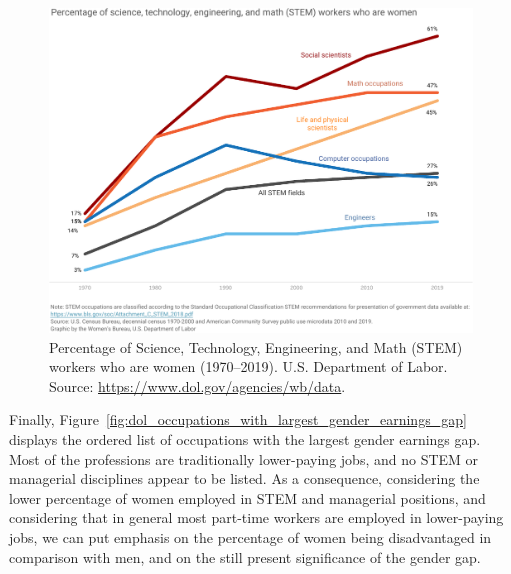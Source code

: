 \begin{figure}[t!]
\includegraphics[scale=.7]{figures/dol_stem_percent_women.pdf}
\centering
\caption{Percentage of Science, Technology, Engineering, and Math (STEM) workers who are women (1970--2019).\newline
U.S. Department of Labor. Source: \upshape\protect\url{https://www.dol.gov/agencies/wb/data}.}
\label{fig:dol_stem_percent_women}
\end{figure}

Finally, Figure~\ref{fig:dol_occupations_with_largest_gender_earnings_gap} displays the ordered list of occupations with the largest gender earnings gap. Most of the professions are traditionally lower-paying jobs, and no STEM or managerial disciplines appear to be listed. As a consequence, considering the lower percentage of women employed in STEM and managerial positions, and considering that in general most part-time workers are employed in lower-paying jobs, we can put emphasis on the percentage of women being disadvantaged in comparison with men, and on the still present significance of the gender gap.

